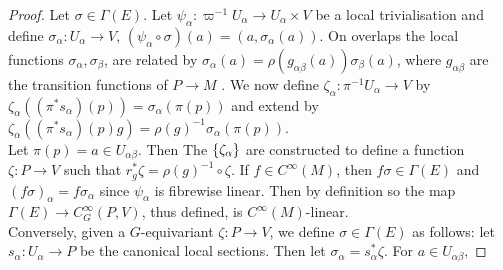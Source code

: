 \documentclass{article}
\begin{document}
\begin{proof}
Let $\sigma \in \Gamma(E)$. Let $\psi_\alpha : \varpi^{-1} U_\alpha \to U_\alpha \times V$ be a local trivialisation and define $\sigma_\alpha : U_\alpha \to V, \, (\psi_\alpha \circ \sigma)(a) = (a,\sigma_\alpha(a))$. On overlaps the local functions $\sigma_\alpha, \sigma_\beta$, are related by $\sigma_\alpha(a) = \rho(g_{\alpha\beta}(a)) \sigma_\beta(a)$, where $g_{\alpha\beta}$ are the transition functions of $P \to M$ . We now define $\zeta_\alpha : \pi^{-1} U_\alpha \to V$ by $\zeta_\alpha((\pi^\ast s_\alpha)(p)) = \sigma_\alpha(\pi(p))$ and extend by $\zeta_\alpha((\pi^\ast s_\alpha)(p)g) = \rho(g)^{-1} \sigma_\alpha(\pi(p))$. \\
Let $\pi(p) = a \in U_{\alpha\beta}$. Then 
The $\left\{ \zeta_\alpha \right\}$ are constructed to define a function $\zeta:P \to V$ such that $r_g^\ast \zeta = \rho(g)^{-1} \circ \zeta$. If $f\in C^\infty(M)$, then $f\sigma \in \Gamma(E)$ and $(f\sigma)_\alpha = f\sigma_\alpha$ since $\psi_\alpha$ is fibrewise linear. Then by definition 
so the map $\Gamma(E) \to C^\infty_G(P,V)$, thus defined, is $C^\infty(M)$-linear. \\
Conversely, given a $G$-equivariant $\zeta:P \to V$, we define $\sigma\in \Gamma(E)$ as follows: let $s_\alpha : U_\alpha \to P$ be the canonical local sections. Then let $\sigma_\alpha = s_\alpha^\ast \zeta$. For $a \in U_{\alpha\beta}$, 
\end{proof}
\end{document}
